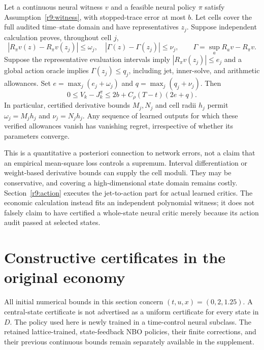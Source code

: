 \begin{theorem}\label{r9:bridge}
Let a continuous neural witness $v$ and a feasible neural policy $\pi$ satisfy Assumption~\ref{r9:witness}, with stopped-trace error at most $b$. Let cells cover the full audited time--state domain and have representatives $z_j$. Suppose independent calculation proves, throughout cell $j$,
\[
 |R_\pi v(z)-R_\pi v(z_j)|\leq\omega_j,
 \quad |\Gamma(z)-\Gamma(z_j)|\leq\nu_j,
 \qquad \Gamma=\sup_aR_av-R_\pi v.
\]
Suppose the representative evaluation intervals imply $|R_\pi v(z_j)|\leq e_j$ and a global action oracle implies $\Gamma(z_j)\leq q_j$, including jet, inner-solve, and arithmetic allowances. Set $e=\max_j(e_j+\omega_j)$ and $q=\max_j(q_j+\nu_j)$. Then
\begin{equation}
 0\leq V_k-J_k^\pi\leq 2b+C_\rho(T-t)(2e+q).\label{r9:bridgebound}
\end{equation}
In particular, certified derivative bounds $M_j,N_j$ and cell radii $h_j$ permit $\omega_j=M_jh_j$ and $\nu_j=N_jh_j$. Any sequence of learned outputs for which these verified allowances vanish has vanishing regret, irrespective of whether its parameters converge.
\end{theorem}
This is a quantitative a posteriori connection to network errors, not a claim that an empirical mean-square loss controls a supremum. Interval differentiation or weight-based derivative bounds can supply the cell moduli. They may be conservative, and covering a high-dimensional state domain remains costly. Section~\ref{r9:action} executes the jet-to-action part for actual learned critics. The economic calculation instead fits an independent polynomial witness; it does not falsely claim to have certified a whole-state neural critic merely because its action audit passed at selected states.

\section{Constructive certificates in the original economy}\label{r9:construct}
All initial numerical bounds in this section concern $(t,u,x)=(0,2,1.25)$. A central-state certificate is not advertised as a uniform certificate for every state in $D$. The policy used here is newly trained in a time-control neural subclass. The retained lattice-trained, state-feedback NBO policies, their finite corrections, and their previous continuous bounds remain separately available in the supplement.

